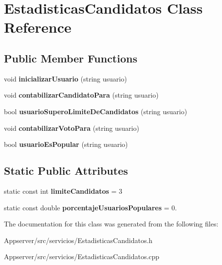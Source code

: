 \hypertarget{classEstadisticasCandidatos}{}\section{Estadisticas\+Candidatos Class Reference}
\label{classEstadisticasCandidatos}
\subsection*{Public Member Functions}
\begin{DoxyCompactItemize}
\item 
void {\bfseries inicializar\+Usuario} (string usuario)\hypertarget{classEstadisticasCandidatos_af27e013c08328f2135fa062d80157e78}{}\label{classEstadisticasCandidatos_af27e013c08328f2135fa062d80157e78}

\item 
void {\bfseries contabilizar\+Candidato\+Para} (string usuario)\hypertarget{classEstadisticasCandidatos_a024e1d4eefb1b58ec5dda6a7b899bf6e}{}\label{classEstadisticasCandidatos_a024e1d4eefb1b58ec5dda6a7b899bf6e}

\item 
bool {\bfseries usuario\+Supero\+Limite\+De\+Candidatos} (string usuario)\hypertarget{classEstadisticasCandidatos_a5d1beb17279826cbd8f95fc4c41b404d}{}\label{classEstadisticasCandidatos_a5d1beb17279826cbd8f95fc4c41b404d}

\item 
void {\bfseries contabilizar\+Voto\+Para} (string usuario)\hypertarget{classEstadisticasCandidatos_a8cda91671f8cc425ad31a13a411162ff}{}\label{classEstadisticasCandidatos_a8cda91671f8cc425ad31a13a411162ff}

\item 
bool {\bfseries usuario\+Es\+Popular} (string usuario)\hypertarget{classEstadisticasCandidatos_a39939198d502a29bc5656e5861d403cf}{}\label{classEstadisticasCandidatos_a39939198d502a29bc5656e5861d403cf}

\end{DoxyCompactItemize}
\subsection*{Static Public Attributes}
\begin{DoxyCompactItemize}
\item 
static const int {\bfseries limite\+Candidatos} = 3\hypertarget{classEstadisticasCandidatos_ad44929762ff0508850e8c2046fb3d6d5}{}\label{classEstadisticasCandidatos_ad44929762ff0508850e8c2046fb3d6d5}

\item 
static const double {\bfseries porcentaje\+Usuarios\+Populares} = 0.\hypertarget{classEstadisticasCandidatos_a6419176ded35f03972e7896c842e10f0}{}\label{classEstadisticasCandidatos_a6419176ded35f03972e7896c842e10f0}

\end{DoxyCompactItemize}


The documentation for this class was generated from the following files\+:\begin{DoxyCompactItemize}
\item 
Appserver/src/servicios/Estadisticas\+Candidatos.\+h\item 
Appserver/src/servicios/Estadisticas\+Candidatos.\+cpp\end{DoxyCompactItemize}
